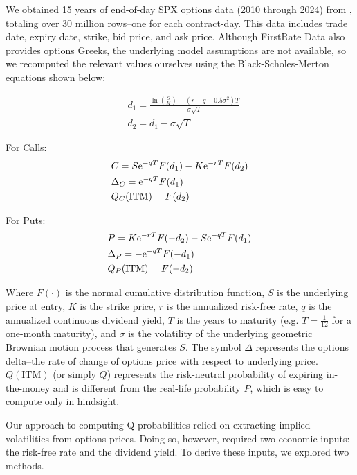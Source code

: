 \documentclass[final,3p,times,authoryear]{elsarticle}
\begin{document}
    We obtained 15 years of end-of-day SPX options data (2010 through 2024) from \citet{firstrate_data_historical_nodate}, totaling over 30 million rows--one for each contract-day. This data includes trade date, expiry date, strike, bid price, and ask price. Although FirstRate Data also provides options Greeks, the underlying model assumptions are not available, so we recomputed the relevant values ourselves using the Black-Scholes-Merton equations shown below:

    \begin{align}
        &d_1 = \frac{
          \ln{\left(\frac{S}{K}\right)} + (r - q + 0.5 \sigma^2) T
        }{
          \sigma \sqrt{T}
        } \\
        &d_2 = d_1 - \sigma \sqrt{T}
    \end{align}

    For Calls:
    \begin{align}
      &C = S {\rm e}^{-q T} F(d_1) - K {\rm e}^{-r T} F(d_2) \\
      &\Delta_C = {\rm e}^{-q T} F(d_1) \\
      &Q_C(\text{ITM}) = F(d_2) \label{eq:q_measure_c}
    \end{align}

    For Puts:
    \begin{align}
      &P = K {\rm e}^{-r T} F(-d_2) - S {\rm e}^{-q T} F(d_1) \\
      &\Delta_P = -{\rm e}^{-q T} F(-d_1) \\
      &Q_P(\text{ITM}) = F(-d_2) \label{eq:q_measure_p}
    \end{align}

    Where $F(\cdot)$ is the normal cumulative distribution function, $S$ is the underlying price at entry, $K$ is the strike price, $r$ is the annualized risk-free rate, $q$ is the annualized continuous dividend yield, $T$ is the years to maturity (e.g. $T=\frac{1}{12}$ for a one-month maturity), and $\sigma$ is the volatility of the underlying geometric Brownian motion process that generates $S$. The symbol $\Delta$ represents the options delta--the rate of change of options price with respect to underlying price. $Q(\text{ITM})$ (or simply $Q$) represents the risk-neutral probability of expiring in-the-money and is different from the real-life probability $P$, which is easy to compute only in hindsight.

    Our approach to computing Q-probabilities relied on extracting implied volatilities from options prices. Doing so, however, required two economic inputs: the risk-free rate and the dividend yield. To derive these inputs, we explored two methods.
\end{document}
